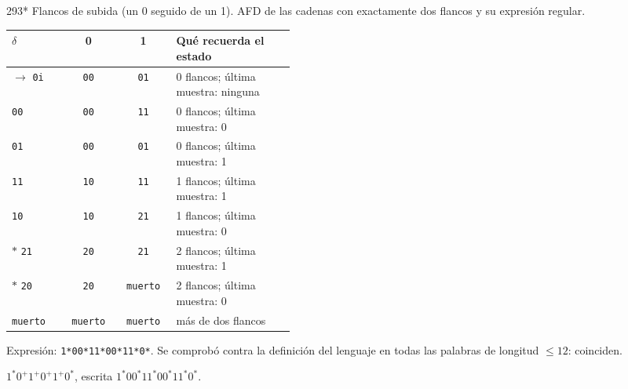 \documentclass[11pt]{article}
\begin{document}
\begin{ejercicio}{293}{*}
Flancos de subida (un 0 seguido de un 1). AFD de las cadenas con exactamente dos flancos y su expresión regular.
\end{ejercicio}
\proc \begin{center}\small\begin{tabular}{lccp{0.42\linewidth}}\toprule
$\delta$ & 0 & 1 & Qué recuerda el estado \\\midrule
$\to$ \texttt{0i} & \texttt{00} & \texttt{01} & 0 flancos; última muestra: ninguna \\
 \texttt{00} & \texttt{00} & \texttt{11} & 0 flancos; última muestra: 0 \\
 \texttt{01} & \texttt{00} & \texttt{01} & 0 flancos; última muestra: 1 \\
 \texttt{11} & \texttt{10} & \texttt{11} & 1 flancos; última muestra: 1 \\
 \texttt{10} & \texttt{10} & \texttt{21} & 1 flancos; última muestra: 0 \\
$*$ \texttt{21} & \texttt{20} & \texttt{21} & 2 flancos; última muestra: 1 \\
$*$ \texttt{20} & \texttt{20} & \texttt{muerto} & 2 flancos; última muestra: 0 \\
 \texttt{muerto} & \texttt{muerto} & \texttt{muerto} & más de dos flancos \\
\bottomrule\end{tabular}\end{center}
\par Expresión: \texttt{1*00*11*00*11*0*}. Se comprobó contra la definición del lenguaje en todas las palabras de longitud $\le 12$: coinciden.

\resp $1^*0^+1^+0^+1^+0^*$, escrita $1^*00^*11^*00^*11^*0^*$.
\end{document}
